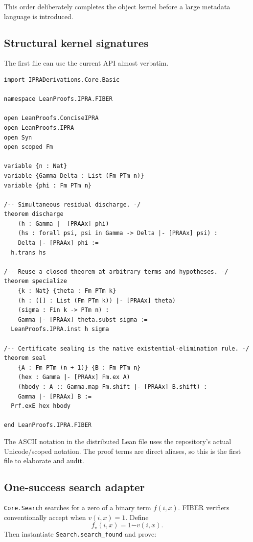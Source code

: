 This order deliberately completes the object kernel before a large metadata
language is introduced.

\subsection{Structural kernel signatures}

The first file can use the current API almost verbatim.

\begin{lstlisting}[language={},caption={Core structural targets}]
import IPRADerivations.Core.Basic

namespace LeanProofs.IPRA.FIBER

open LeanProofs.ConciseIPRA
open LeanProofs.IPRA
open Syn
open scoped Fm

variable {n : Nat}
variable {Gamma Delta : List (Fm PTm n)}
variable {phi : Fm PTm n}

/-- Simultaneous residual discharge. -/
theorem discharge
    (h : Gamma |- [PRAAx] phi)
    (hs : forall psi, psi in Gamma -> Delta |- [PRAAx] psi) :
    Delta |- [PRAAx] phi :=
  h.trans hs

/-- Reuse a closed theorem at arbitrary terms and hypotheses. -/
theorem specialize
    {k : Nat} {theta : Fm PTm k}
    (h : ([] : List (Fm PTm k)) |- [PRAAx] theta)
    (sigma : Fin k -> PTm n) :
    Gamma |- [PRAAx] theta.subst sigma :=
  LeanProofs.IPRA.inst h sigma

/-- Certificate sealing is the native existential-elimination rule. -/
theorem seal
    {A : Fm PTm (n + 1)} {B : Fm PTm n}
    (hex : Gamma |- [PRAAx] Fm.ex A)
    (hbody : A :: Gamma.map Fm.shift |- [PRAAx] B.shift) :
    Gamma |- [PRAAx] B :=
  Prf.exE hex hbody

end LeanProofs.IPRA.FIBER
\end{lstlisting}

The ASCII notation in the distributed Lean file uses the repository's actual
Unicode/scoped notation.  The proof terms are direct aliases, so this is the
first file to elaborate and audit.

\subsection{One-success search adapter}

\texttt{Core.Search} searches for a zero of a binary term \(f(i,x)\).  FIBER
verifiers conventionally accept when \(v(i,x)=1\).  Define
\[
       f_v(i,x)=1\mathbin{\dot-}v(i,x).
\]
Then instantiate \texttt{Search.search\_found} and prove:

